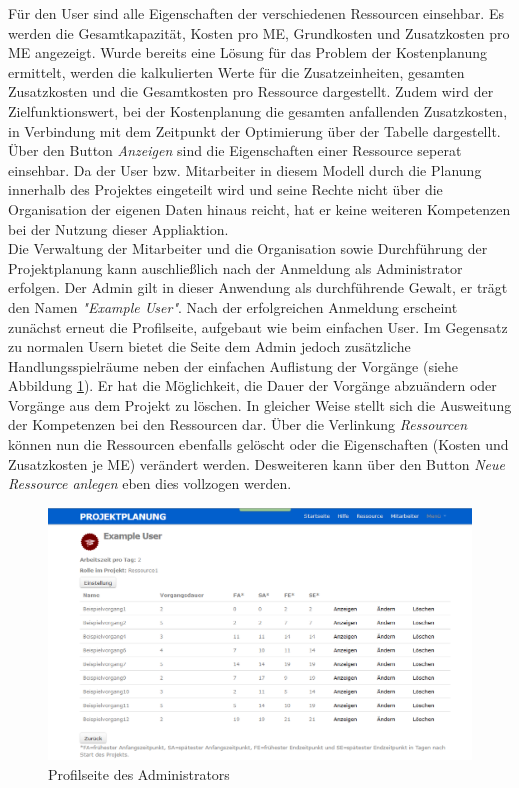 \documentclass[a4paper,12pt,parskip,bibtotoc,liststotoc]{article}
\begin{document}
Für den User sind alle Eigenschaften der verschiedenen Ressourcen einsehbar. Es werden die Gesamtkapazität, Kosten pro ME, Grundkosten und Zusatzkosten pro ME angezeigt. Wurde bereits eine Lösung für das Problem der Kostenplanung ermittelt, werden die kalkulierten Werte für die Zusatzeinheiten, gesamten Zusatzkosten und die Gesamtkosten pro Ressource dargestellt. Zudem wird der Zielfunktionswert, bei der Kostenplanung die gesamten anfallenden Zusatzkosten, in Verbindung mit dem Zeitpunkt der Optimierung über der Tabelle dargestellt. Über den Button \textit{Anzeigen} sind die Eigenschaften einer Ressource seperat einsehbar. Da der User bzw. Mitarbeiter in diesem Modell durch die Planung innerhalb des Projektes eingeteilt wird und seine Rechte nicht über die Organisation der eigenen Daten hinaus reicht, hat er keine weiteren Kompetenzen bei der Nutzung dieser Appliaktion. \\

Die Verwaltung der Mitarbeiter und die Organisation sowie Durchführung der Projektplanung kann auschließlich nach der Anmeldung als Administrator erfolgen. Der Admin gilt in dieser Anwendung als durchführende Gewalt, er trägt den Namen \textit{"Example User"}. Nach der erfolgreichen Anmeldung erscheint zunächst erneut die Profilseite, aufgebaut wie beim einfachen User. Im Gegensatz zu normalen Usern bietet die Seite dem Admin jedoch zusätzliche Handlungsspielräume neben der einfachen Auflistung der Vorgänge (siehe Abbildung \ref{ProAd}). Er hat die Möglichkeit, die Dauer der Vorgänge abzuändern oder Vorgänge aus dem Projekt zu löschen. In gleicher Weise stellt sich die Ausweitung der Kompetenzen bei den Ressourcen dar. Über die Verlinkung \textit{Ressourcen} können nun die Ressourcen ebenfalls gelöscht oder die Eigenschaften (Kosten und Zusatzkosten je ME) verändert werden. Desweiteren kann über den Button \textit{Neue Ressource anlegen} eben dies vollzogen werden.\\

\begin{figure}[h!]
  \begin{center}
    \includegraphics[width=120mm]{Bilder/Profilseite_Admin.png}
    \caption{Profilseite des Administrators}  \label{ProAd}
  \end{center}
\end{figure}             
\end{document}
